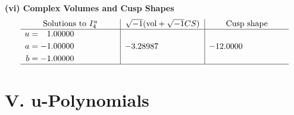 \documentclass[1p]{elsarticle_modified}
\theoremstyle{definition}
\newcommand{\I}{\sqrt{-1}}
\begin{document}
\newpage\flushleft \textbf{(vi) Complex Volumes and Cusp Shapes}
$$\begin{array}{c|c|c}  
\text{Solutions to }I^u_{4}& \I (\text{vol} + \sqrt{-1}CS) & \text{Cusp shape}\\
 \hline 
\begin{aligned}
u &= \phantom{-}1.00000\phantom{ +0.000000I} \\
a &= -1.00000\phantom{ +0.000000I} \\
b &= -1.00000\phantom{ +0.000000I}\end{aligned}
 & -3.28987\phantom{ +0.000000I} & -12.0000\phantom{ +0.000000I}\\
 \hline 
 \end{array}$$\newpage
\newpage\renewcommand{\arraystretch}{1}
\centering \section*{ V. u-Polynomials}
\end{document}
